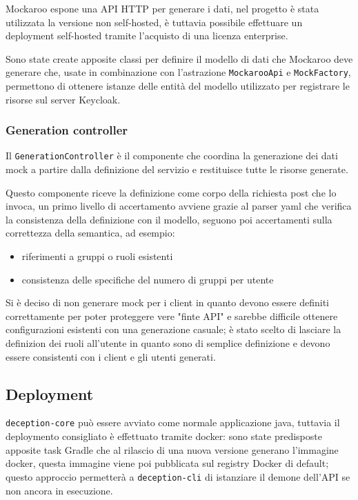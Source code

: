 Mockaroo espone una API HTTP per generare i dati, nel progetto è stata utilizzata la versione non self-hosted, è tuttavia possibile effettuare un deployment self-hosted tramite l'acquisto di una licenza enterprise.

Sono state create apposite classi per definire il modello di dati che Mockaroo deve generare che, usate in combinazione con l'astrazione \texttt{MockarooApi} e \texttt{MockFactory}, permettono di ottenere istanze delle entità del modello utilizzato per registrare le risorse sul server Keycloak.

\subsubsection{Generation controller}

Il \texttt{GenerationController} è il componente che coordina la generazione dei dati mock a partire dalla definizione del servizio e restituisce tutte le risorse generate.


Questo componente riceve la definizione come corpo della richiesta post che lo invoca, un primo livello di accertamento avviene grazie al parser yaml che verifica la consistenza della definizione con il modello, seguono poi accertamenti sulla correttezza della semantica, ad esempio:
\begin{itemize}
    \item riferimenti a gruppi o ruoli esistenti
    \item consistenza delle specifiche del numero di gruppi per utente
\end{itemize}

Si è deciso di non generare mock per i client in quanto devono essere definiti correttamente per poter proteggere vere "finte API" e sarebbe difficile ottenere configurazioni esistenti con una generazione casuale; è stato scelto di lasciare la definizion dei ruoli all'utente in quanto sono di semplice definizione e devono essere consistenti con i client e gli utenti generati.

\subsection{Deployment}

\texttt{deception-core} può essere avviato come normale applicazione java, tuttavia il deploymento consigliato è effettuato tramite docker: sono state predisposte apposite task Gradle che al rilascio di una nuova versione generano l'immagine docker, questa immagine viene poi pubblicata sul registry Docker di default; questo approccio permetterà a \texttt{deception-cli} di istanziare il demone dell'API se non ancora in esecuzione.








